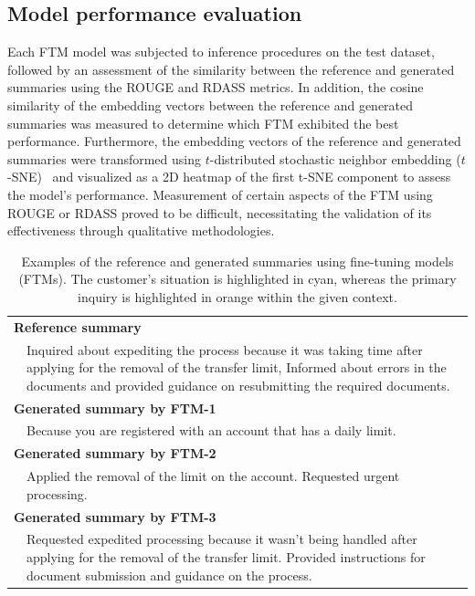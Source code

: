 \documentclass[sigconf]{acmart}
\begin{document}
\subsection{Model performance evaluation}
Each FTM model was subjected to inference procedures on the test dataset, followed by an assessment of the similarity between the reference and generated  summaries using the ROUGE and RDASS metrics. In addition, the cosine similarity of the embedding vectors between the reference and generated summaries was measured to determine which FTM exhibited the best performance. Furthermore, the embedding vectors of the reference and generated summaries were transformed using $t$-distributed stochastic neighbor embedding ($t$-SNE)~\cite{vanDerMaaten2008} and visualized as a 2D heatmap of the first t-SNE component to assess the model's performance. Measurement of certain aspects of the FTM using ROUGE or RDASS proved to be difficult, necessitating the validation of its effectiveness through qualitative methodologies.





\begin{table}[t!]
  \fontsize{8pt}{8pt}\small
  \caption{Examples of the reference and generated summaries using fine-tuning models (FTMs). The customer's situation is highlighted in cyan, whereas the primary inquiry is highlighted in orange within the given context.}

  \begin{tabular}{l p{7.8cm} }
      \toprule 
      \multicolumn{2}{l}{\bf Reference summary} \\  
      & {\color{cyan} Inquired about expediting the process because it was taking time after applying for the removal of the transfer limit}, {\color{orange}Informed about errors in the documents and provided guidance on resubmitting the required documents.}\\
      \midrule 
      \multicolumn{2}{l}{\bf Generated summary by FTM-1}\\ 
      & Because you are registered with an account that has a daily limit.\\
      \midrule 
      \multicolumn{2}{l}{\bf Generated summary by FTM-2}\\
      &  {\color{cyan}Applied the removal of the limit on the account. Requested urgent processing}.\\
      \midrule 
      \multicolumn{2}{l}{\bf Generated summary by FTM-3}\\
      & {\color{cyan} Requested expedited processing because it wasn't being handled after applying for the removal of the transfer limit}. {\color{orange}Provided instructions for document submission and guidance on the process}.\\
      \bottomrule
  \end{tabular}
  \label{table_examples}
\end{table}
\end{document}
